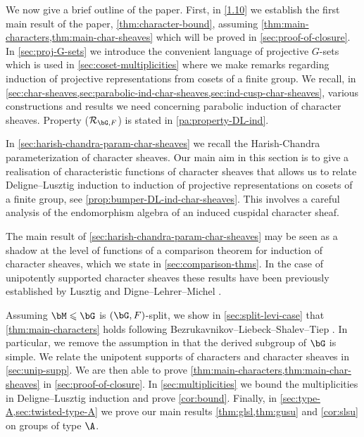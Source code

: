 \documentclass[eqthmnum,nocolour,skinny]{jt-calcs}
\begin{document}
\begin{pa}
We now give a brief outline of the paper. First, in \cref{1.10} we establish the first main result of the paper, \cref{thm:character-bound},
assuming \cref{thm:main-characters,thm:main-char-sheaves} which will be proved in \cref{sec:proof-of-closure}. 
In \cref{sec:proj-G-sets} we introduce the convenient language of projective $G$-sets which is used in \cref{sec:coset-multiplicities} where we make remarks regarding induction of projective representations from cosets of a finite group. We recall, in \cref{sec:char-sheaves,sec:parabolic-ind-char-sheaves,sec:ind-cusp-char-sheaves}, various constructions and results we need concerning parabolic induction of character sheaves. Property ($\mathcal{R}_{\bG,F}$) is stated in \cref{pa:property-DL-ind}.
\end{pa}

\begin{pa}
In \cref{sec:harish-chandra-param-char-sheaves} we recall the Harish-Chandra parameterization of character sheaves. Our main aim in this section is to give a realisation of characteristic functions of character sheaves that allows us to relate Deligne--Lusztig induction to induction of projective representations on cosets of a finite group, see \cref{prop:bumper-DL-ind-char-sheaves}. This involves a careful analysis of the endomorphism algebra of an induced cuspidal character sheaf.
\end{pa}

\begin{pa}
The main result of \cref{sec:harish-chandra-param-char-sheaves} may be seen as a shadow at the level of functions of a comparison theorem for induction of character sheaves, which we state in \cref{sec:comparison-thms}. In the case of unipotently supported character sheaves these results have been previously established by Lusztig \cite[2.4(d)]{lusztig:1986:on-the-character-values} and Digne--Lehrer--Michel \cite[3.3]{digne-lehrer-michel:1997:gelfand-grave-characters-disconnected}.
\end{pa}

\begin{pa}
Assuming $\bM \leqslant \bG$ is $(\bG,F)$-split, we show in \cref{sec:split-levi-case} that \cref{thm:main-characters} holds following Bezrukavnikov--Liebeck--Shalev--Tiep \cite[2.6]{bezrukavnikov-liebeck-shalev-tiep:2017:character-bounds-grps-Lie-type}. In particular, we remove the assumption in \cite{bezrukavnikov-liebeck-shalev-tiep:2017:character-bounds-grps-Lie-type} that the derived subgroup of $\bG$ is simple. We relate the unipotent supports of characters and character sheaves in \cref{sec:unip-supp}. We are then able to prove \cref{thm:main-characters,thm:main-char-sheaves} in \cref{sec:proof-of-closure}. In \cref{sec:multiplicities} we bound the multiplicities in Deligne--Lusztig induction and prove \cref{cor:bound}. Finally, in \cref{sec:type-A,sec:twisted-type-A} we prove our main results \cref{thm:glsl,thm:gusu} and \cref{cor:slsu} on groups of type $\A$.
\end{pa}
\end{document}
